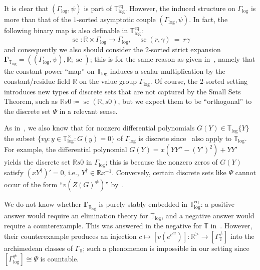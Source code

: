 \documentclass[11pt]{amsart}
\theoremstyle{plain}
\theoremstyle{definition}
\numberwithin{equation}{section}
\newcommand\R{\mathbb{R}}
\newcommand\0{\varnothing}
\begin{document}
\medskip\noindent
It is clear that $(\Gamma_{\log},\psi)$ is part of $\mathbb{T}_{\log}^{\operatorname{eq}}$. However, the induced structure on $\Gamma_{\log}$ is more than that of the $1$-sorted asymptotic couple $(\Gamma_{\log},\psi)$. In fact, the following binary map is also definable in $\mathbb{T}_{\log}^{\operatorname{eq}}$:
\[
\operatorname{sc} \colon \R\times\Gamma_{\log}\to\Gamma_{\log},\quad \operatorname{sc}(r,\gamma) \ = \ r\gamma
\]
and consequently we also should consider the $2$-sorted strict expansion $\mathbf{\Gamma}_{\mathbb{T}_{\log}}=((\Gamma_{\log},\psi),\R;\operatorname{sc})$; this is for the same reason as given in~\cite{adh-revisitingclosedac}, namely that the constant power ``map'' on $\mathbb{T}_{\log}$ induces a scalar multiplication by the constant/residue field $\R$ on the value group $\Gamma_{\log}$.
Of course, the $2$-sorted setting introduces new types of discrete sets that are not captured by the Small Sets Theorem, such as $\R s0\coloneqq\operatorname{sc}(\R,s0)$, but we expect them to be ``orthogonal'' to the discrete set $\Psi$ in a relevant sense.


\medskip\noindent
As in~\cite{adh-revisitingclosedac}, we also know that for nonzero differential polynomials $G(Y)\in\mathbb{T}_{\log}\{Y\}$ the subset $\{vy:y\in\mathbb{T}_{\log}^{\times}:G(y)=0\}$ of $\Gamma_{\log}$ is discrete since~\cite[Corollaries 14.3.10, 14.3.11]{ADAMTT} also apply to $\mathbb{T}_{\log}$. For example, the differential polynomial $G(Y)=x(YY''-(Y')^2)+YY'$ yields the discrete set $\R s0$ in $\Gamma_{\log}$; this is because the nonzero zeros of $G(Y)$ satisfy $(xY^{\dagger})'=0$, i.e., $Y^{\dagger}\in\R x^{-1}$. 
Conversely, certain discrete sets like $\Psi$ cannot occur of the form ``$v(Z(G)^{\neq})$'' by~\cite[Corollary 13.4.5]{ADAMTT}.


\medskip\noindent
We do not know whether $\mathbf{\Gamma}_{\mathbb{T}_{\log}}$ is purely stably embedded in $\mathbb{T}_{\log}^{\operatorname{eq}}$: a positive answer would require an elimination theory for $\mathbb{T}_{\log}$, and a negative answer would require a counterexample. This was answered in the negative for $\mathbb{T}$ in~\cite[p.\ 532]{adh-revisitingclosedac}.
However, their counterexample produces an injection $c\mapsto [v(e^{e^{cx}})]:\R^>\to[\Gamma_{\mathbb{T}}^{\neq}]$ into the archimedean classes of $\Gamma_{\mathbb{T}}$; such a phenomenon is impossible in our setting since $[\Gamma_{\log}^{\neq}]\cong\Psi$ is countable.
\end{document}
